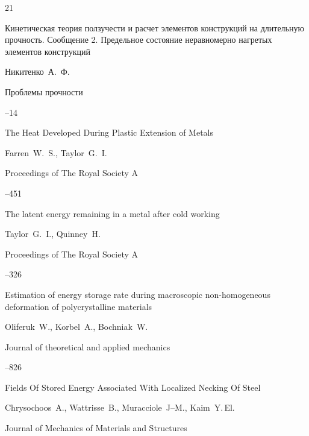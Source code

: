 \begin{thebibliography}{21}

\paper Кинетическая теория ползучести и расчет элементов конструкций на длительную прочность. Сообщение 2. Предельное состояние неравномерно нагретых элементов конструкций

\by Никитенко~А.~Ф.

\jour Проблемы прочности



--14




\paper The Heat Developed During Plastic Extension of Metals

\by Farren~W.~S., Taylor~G.~I.

\jour Proceedings of The Royal Society A



--451




\paper The latent energy remaining in a metal after cold working

\by  Taylor~G.~I., Quinney~H.

\jour Proceedings of The Royal Society A



--326




\paper Estimation of energy storage rate during macroscopic non-homogeneous deformation of polycrystalline materials

\by  Oliferuk~W., Korbel~A., Bochniak~W.

\jour Journal of theoretical and applied mechanics



--826




\paper Fields Of Stored Energy Associated With Localized Necking Of Steel

\by  Chrysochoos~A., Wattrisse~B., Muracciole~J--M., Kaim~Y.\,El.

\jour Journal of Mechanics of Materials and Structures


\end{thebibliography}
